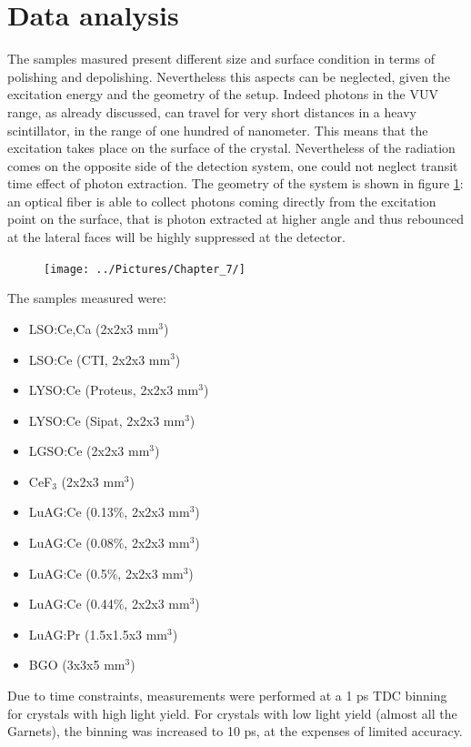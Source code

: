 
\section{Data analysis}
The samples masured present different size and surface condition in terms of polishing and depolishing.
Nevertheless this aspects can be neglected, given the excitation energy and the geometry of the setup.
Indeed photons in the VUV range, as already discussed, can travel for very short distances in a heavy scintillator, in the range of one hundred of nanometer. This means that the excitation takes place on the surface of the crystal. Nevertheless of the radiation comes on the opposite side of the detection system, one could not neglect transit time effect of photon extraction. The geometry of the system is shown in figure \ref{fig:geom}: an optical fiber is able to collect photons coming directly from the excitation point on the surface, that is photon extracted at higher angle and thus rebounced at the lateral faces will be highly suppressed at the detector.
\begin{figure}[htbp]
\begin{center}
\texttt{[image: ../Pictures/Chapter\_7/]}
\end{center}
\caption[]{}
\label{fig:geom}
\end{figure}
The samples measured were:
\begin{itemize}
\item LSO:Ce,Ca (2x2x3 mm$^{3}$) 
\item LSO:Ce (CTI, 2x2x3 mm$^{3}$)
\item LYSO:Ce (Proteus, 2x2x3 mm$^{3}$)
\item LYSO:Ce (Sipat, 2x2x3 mm$^{3}$)
\item LGSO:Ce (2x2x3 mm$^{3}$)
\item CeF$_{3}$ (2x2x3 mm$^{3}$)
\item LuAG:Ce (0.13$\%$, 2x2x3 mm$^{3}$)
\item LuAG:Ce (0.08$\%$, 2x2x3 mm$^{3}$)
\item LuAG:Ce (0.5$\%$, 2x2x3 mm$^{3}$) 
\item LuAG:Ce (0.44$\%$, 2x2x3 mm$^{3}$)
\item LuAG:Pr (1.5x1.5x3 mm$^{3}$)
\item BGO (3x3x5 mm$^{3}$)
\end{itemize}
Due to time constraints, measurements were performed at a 1 ps TDC binning for crystals with high light yield. For crystals with low light yield (almost all the Garnets), the binning was increased to 10 ps, at the expenses of limited accuracy.

